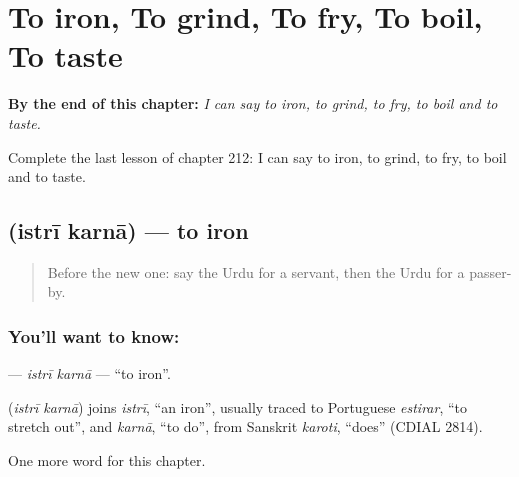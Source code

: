 
\chapter{To iron, To grind, To fry, To boil, To taste}
\label{ch:ur-to-iron-to-grind-to-fry-to-boil-to-taste}

\begin{chapteropening}
\textbf{By the end of this chapter:} \emph{I can say to iron, to grind, to fry, to boil and to taste.}

Complete the last lesson of chapter 212: I can say to iron, to grind, to fry, to boil and to taste.
\end{chapteropening}

\section[\texorpdfstring{\ur{استری} \ur{کرنا} (istrī karnā)}{استری کرنا (istrī karnā)}]{  (istrī karnā) — to iron}

\label{lesson:UR-C212-istri-karna}



\begin{quote}
Before the new one: say the Urdu for a servant, then the Urdu for a passer-by.
\end{quote}

\subsection*{You'll want to know:  }
\textbf{ } — \emph{istrī karnā} — \textquotedblleft{}to iron\textquotedblright{}.

\begin{cousinweb}
\textbf{ } (\emph{istrī karnā}) joins \emph{istrī}, \textquotedblleft{}an iron\textquotedblright{}, usually traced to Portuguese \emph{estirar}, \textquotedblleft{}to stretch out\textquotedblright{}, and \emph{karnā}, \textquotedblleft{}to do\textquotedblright{}, from Sanskrit \emph{karoti}, \textquotedblleft{}does\textquotedblright{} (CDIAL 2814).
\end{cousinweb}

\begin{grammarlens}[title={What you've built}]
One more word for this chapter.
\end{grammarlens}


